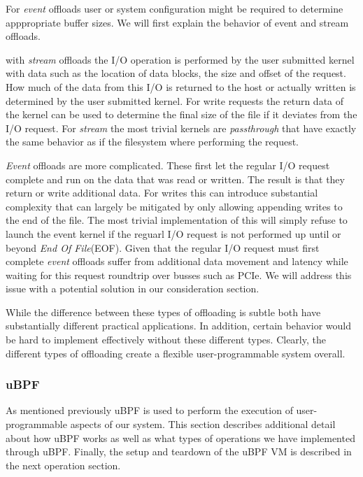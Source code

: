 For \textit{event} offloads user or system configuration might be required to
determine apppropriate buffer sizes. We will first explain the behavior of event
and stream offloads.

with \textit{stream} offloads the I/O operation is performed by the user
submitted kernel with data such as the location of data blocks, the size and
offset of the request. How much of the data from this I/O is returned to the
host or actually written is determined by the user submitted kernel. For write
requests the return data of the kernel can be used to determine the final size
of the file if it deviates from the I/O request. For \textit{stream} the most
trivial kernels are \textit{passthrough} that have exactly the same behavior as
if the filesystem where performing the request.

\textit{Event} offloads are more complicated. These first let the regular I/O
request complete and run on the data that was read or written. The result is
that they return or write additional data. For writes this can introduce
substantial complexity that can largely be mitigated by only allowing appending
writes to the end of the file. The most trivial implementation of this will
simply refuse to launch the event kernel if the reguarl I/O request is not
performed up until or beyond \textit{End Of File}(EOF). Given that the regular
I/O request must first complete \textit{event} offloads suffer from additional
data movement and latency while waiting for this request roundtrip over busses
such as PCIe. We will address this issue with a potential solution in our
consideration section.

While the difference between these types of offloading is subtle both have
substantially different practical applications. In addition, certain behavior
would be hard to implement effectively without these different types. Clearly,
the different types of offloading create a flexible user-programmable system
overall.

\subsubsection{uBPF}

As mentioned previously uBPF \cite{ubpf} is used to perform the execution of
user-programmable aspects of our system. This section describes additional
detail about how uBPF works as well as what types of operations we have
implemented through uBPF. Finally, the setup and teardown of the uBPF VM is
described in the next operation section.

